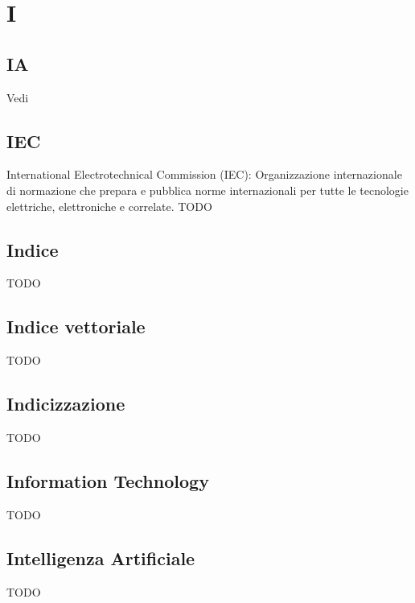 \section{I}

\vspace{2em}
\subsection*{IA}
\par Vedi 

\vspace{2em}
\subsection*{IEC}
International Electrotechnical Commission (IEC): Organizzazione internazionale di normazione che prepara e pubblica norme internazionali per tutte le tecnologie elettriche, elettroniche e correlate.
TODO

\vspace{2em}
\subsection*{Indice}
TODO

\vspace{2em}
\subsection*{Indice vettoriale}
TODO

\vspace{2em}
\subsection*{Indicizzazione}
TODO

\vspace{2em}
\subsection*{Information Technology}
TODO

\vspace{2em}
\subsection*{Intelligenza Artificiale}
TODO

\vspace{2em}
